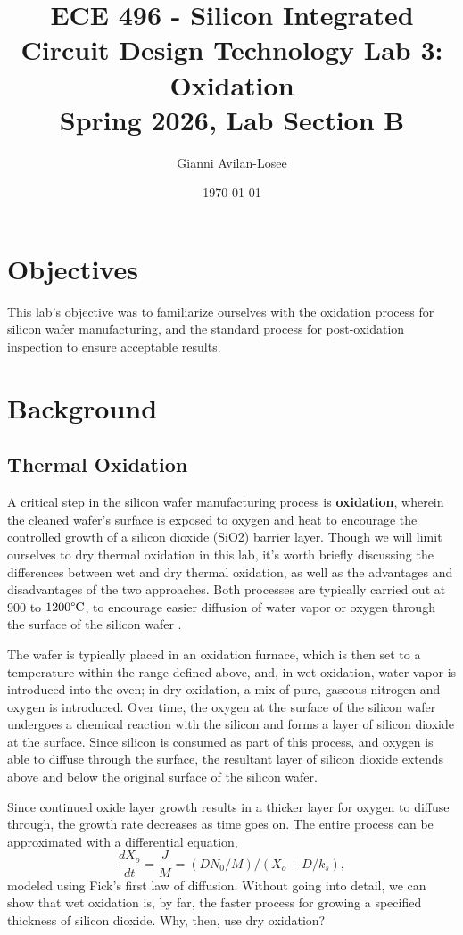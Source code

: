 \documentclass[12pt]{report}
\title{ECE 496 - Silicon Integrated Circuit Design Technology Lab 3: Oxidation \\ Spring 2026, Lab Section B}
\author{Gianni Avilan-Losee}
\date{\today}
\begin{document}
\maketitle
\setcounter{chapter}{3}
\setcounter{section}{0}
\section{Objectives}

This lab's objective was to familiarize ourselves with the oxidation process for silicon wafer manufacturing, and the standard process for post-oxidation inspection to ensure acceptable results.

\section{Background}

\subsection{Thermal Oxidation}

A critical step in the silicon wafer manufacturing process is \textbf{oxidation}, wherein the cleaned wafer's surface is exposed to oxygen and heat to encourage the controlled growth of a silicon dioxide (SiO2) barrier layer. Though we will limit ourselves to dry thermal oxidation in this lab, it's worth briefly discussing the differences between wet and dry thermal oxidation, as well as the advantages and disadvantages of the two approaches. Both processes are typically carried out at \(900\) to \(1200 \degree \mathrm{C}\), to encourage easier diffusion of water vapor or oxygen through the surface of the silicon wafer \cite{textbook}. 

The wafer is typically placed in an oxidation furnace, which is then set to a temperature within the range defined above, and, in wet oxidation, water vapor is introduced into the oven; in dry oxidation, a mix of pure, gaseous nitrogen and oxygen is introduced. Over time, the oxygen at the surface of the silicon wafer undergoes a chemical reaction with the silicon and forms a layer of silicon dioxide at the surface. Since silicon is consumed as part of this process, and oxygen is able to diffuse through the surface, the resultant layer of silicon dioxide extends above and below the original surface of the silicon wafer.

Since continued oxide layer growth results in a thicker layer for oxygen to diffuse through, the growth rate decreases as time goes on. The entire process can be approximated with a differential equation, 
\[
  \frac{dX_o}{dt} = \frac{J}{M} = (DN_0/M)/(X_o + D/k_s),
\]
modeled using Fick's first law of diffusion. Without going into detail, we can show that wet oxidation is, by far, the faster process for growing a specified thickness of silicon dioxide. Why, then, use dry oxidation? 
\end{document}
